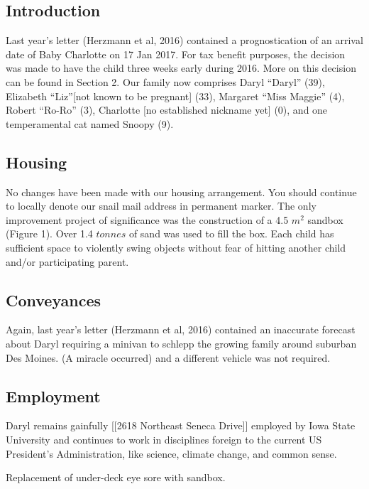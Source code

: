 \documentclass[letterpaper,11pt]{article}
\makeatletter
\newenvironment{figurehere}
  {\def\@captype{figure}}
  {}
\makeatother
\begin{document}
\begin{multicols}{2}

\section{Introduction} 

Last year's letter (Herzmann et al, 2016) contained a prognostication of an
arrival date of Baby Charlotte on 17 Jan 2017.  For tax benefit purposes, the
decision was made to have the child three weeks early during 2016. More on this
decision can be found in Section 2. Our family now comprises Daryl
\enquote{Daryl} (39), Elizabeth \enquote{Liz}[not known to be pregnant] (33),
Margaret \enquote{Miss Maggie} (4), Robert \enquote{Ro-Ro} (3), Charlotte [no
established nickname yet] (0), and one temperamental  cat named Snoopy (9).

\subsection{Housing}

No changes have been made with our housing arrangement. You should continue
to locally denote our snail mail address in permanent marker. The only
improvement project of significance was the construction of a 4.5 $m^{2}$
sandbox (Figure 1). Over 1.4 $tonnes$ of sand was used to fill the box.  Each child has sufficient space
to violently swing objects without fear of hitting another child and/or
participating parent.

\subsection{Conveyances}

Again, last year's letter (Herzmann et al, 2016) contained an inaccurate
forecast about Daryl requiring a minivan to schlepp the growing family around suburban
Des Moines. (A miracle occurred) and a different vehicle was not required.

\subsection{Employment}
Daryl remains gainfully [[2618 Northeast Seneca Drive]] employed by Iowa State
University and continues to work in disciplines foreign to the current US
President's Administration, like science, climate change, and common sense.

\begin{figurehere}
 \centering   
 \caption{Replacement of under-deck eye sore with sandbox.}
\end{figurehere}


\end{multicols}
\end{document}
